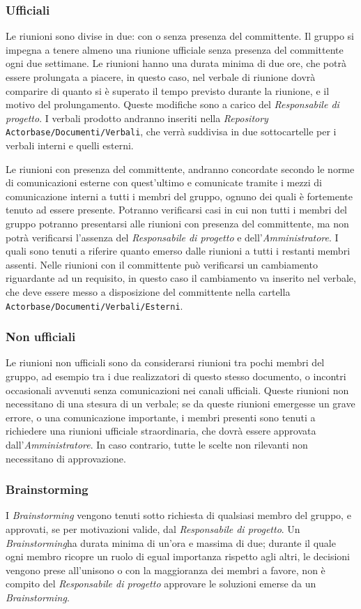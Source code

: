 \documentclass[a4paper]{report}
\begin{document}
		\subsubsection{Ufficiali}
		Le riunioni sono divise in due: con o senza presenza del committente. Il gruppo si impegna a tenere almeno una riunione
		ufficiale senza presenza del committente ogni due settimane. Le riunioni hanno una durata minima di due ore, che potrà 
		essere prolungata a piacere, in questo caso, nel verbale di riunione dovrà comparire di quanto si è superato il tempo
		previsto durante la riunione, e il motivo del prolungamento. Queste modifiche sono a carico del \emph{Responsabile di progetto}.
		I verbali prodotto andranno inseriti nella \emph{Repository} \verb|Actorbase/Documenti/Verbali|, che verrà suddivisa in due
		sottocartelle per i verbali interni e quelli esterni.
		
		Le riunioni con presenza del committente, andranno concordate secondo le norme di comunicazioni esterne con quest'ultimo
		e comunicate tramite i mezzi di comunicazione interni a tutti i membri del gruppo, ognuno dei quali è fortemente tenuto ad
		essere presente. Potranno verificarsi casi in cui non tutti i membri del gruppo potranno presentarsi alle riunioni con 
		presenza del committente, ma non potrà verificarsi l'assenza del \emph{Responsabile di progetto} e dell'\emph{Amministratore}.
		I quali sono tenuti a riferire quanto emerso dalle riunioni a tutti i restanti membri assenti. Nelle riunioni con il
		committente può verificarsi un cambiamento riguardante ad un requisito, in questo caso il cambiamento va inserito nel
		verbale, che deve essere messo a disposizione del committente nella cartella \verb|Actorbase/Documenti/Verbali/Esterni|.
		\subsubsection{Non ufficiali}
		Le riunioni non ufficiali sono da considerarsi riunioni tra pochi membri del gruppo, ad esempio tra i due realizzatori di questo
		stesso documento, o incontri occasionali avvenuti senza comunicazioni nei canali ufficiali. Queste riunioni non necessitano di 
		una stesura di un verbale; se da queste riunioni emergesse un grave errore, o una comunicazione importante, i membri presenti
		sono tenuti a richiedere una riunioni ufficiale straordinaria, che dovrà essere approvata dall'\emph{Amministratore}. In caso 
		contrario, tutte le scelte non rilevanti non necessitano di approvazione. 
		\subsubsection{Brainstorming}
		I \emph{Brainstorming} vengono tenuti sotto richiesta di qualsiasi membro del gruppo, e approvati, se per motivazioni
		valide, dal \emph{Responsabile di progetto}. Un \emph{Brainstorming}ha durata minima di un'ora e massima di due; durante il quale
		ogni membro ricopre un ruolo di egual importanza rispetto agli altri, le decisioni vengono prese all'unisono o con la maggioranza 
		dei membri a favore, non è compito del \emph{Responsabile di progetto} approvare le soluzioni emerse da un \emph{Brainstorming}.
		
\end{document}
